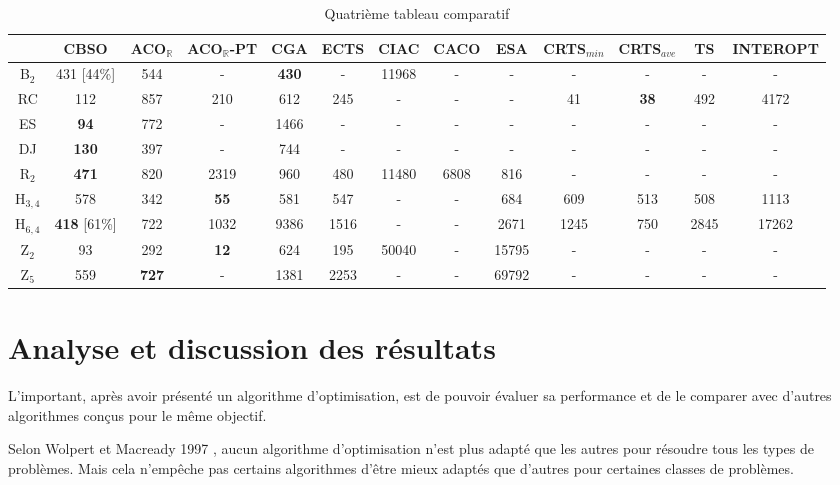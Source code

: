 \begin{landscape}
\vspace{1em}

\begin{table}[H]\centering
	\begin{tabular}{ccccccccccccc}
		\toprule\textbf{} & \textbf{CBSO} & \textbf{ACO$_\mathbb{R}$} & \textbf{ACO$_\mathbb{R}$-PT} & \textbf{CGA} & \textbf{ECTS} & \textbf{CIAC} & \textbf{CACO} & \textbf{ESA} & \textbf{CRTS$_{min}$} & \textbf{CRTS$_{ave}$} & \textbf{TS} & \textbf{INTEROPT}\\    \midrule
		B$_2$ & 431 [44\%] & 544 & - & \textbf{430} & -  & 11968 & - & - & - & - & - & - \\
		RC & 112  & 857 & 210 & 612 & 245  & - & - & - & 41 & \textbf{38} & 492 & 4172 \\
		ES & \textbf{94} & 772 & - & 1466 & -  & - & - & - & - & - & - & - \\
		DJ & \textbf{130} & 397 & - & 744 & -  & - & - & - & - & - & - & - \\
		R$_2$ & \textbf{471} & 820 & 2319 & 960 & 480  & 11480 & 6808 & 816 & - & - & - & - \\
		H$_{3,4}$ & 578 & 342 & \textbf{55} & 581 & 547  & - & - & 684 & 609 & 513 & 508 & 1113 \\
		H$_{6,4}$ & \textbf{418} [61\%] & 722 & 1032 & 9386 & 1516  & - & - & 2671 & 1245 & 750 & 2845 & 17262 \\
		Z$_2$ & 93 & 292 & \textbf{12} & 624 & 195  & 50040 & - & 15795 & - & - & - & - \\
		Z$_5$ & 559 & \textbf{727} & - & 1381 & 2253  & - & - & 69792 & - & - & - & - \\
	\bottomrule	
	\end{tabular}
	\caption{Quatrième tableau comparatif\label{evaltable4}}
\end{table}
\end{landscape}
\vspace{18em}
\section{Analyse et discussion des résultats}
L'important, après avoir présenté un algorithme d'optimisation, est de pouvoir évaluer sa performance et de le comparer avec d'autres algorithmes conçus pour le même objectif.

Selon Wolpert et Macready 1997 \cite{wolpert1997no}, aucun algorithme d'optimisation n'est plus adapté que les autres pour résoudre tous les types de problèmes. Mais cela n'empêche pas certains algorithmes d'être mieux adaptés que d'autres pour certaines classes de problèmes. 

